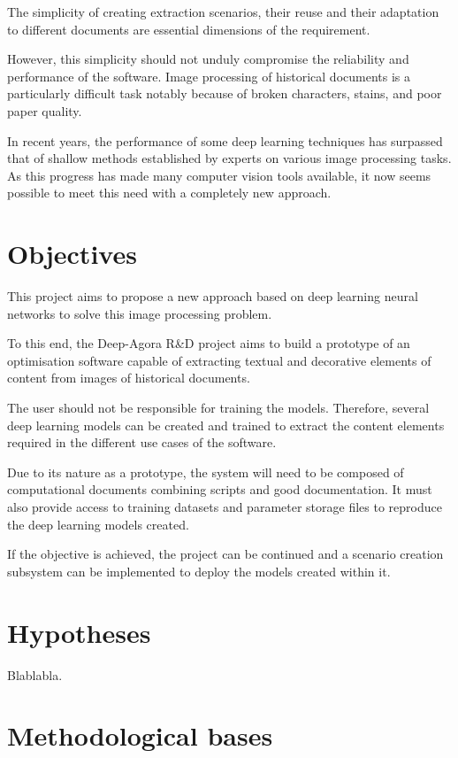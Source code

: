 \documentclass{polytech/polytech}
\numberwithin{figure}{chapter}
\begin{document}
The simplicity of creating extraction scenarios, their reuse and their adaptation to different documents are essential dimensions of the requirement.

However, this simplicity should not unduly compromise the reliability and performance of the software.
Image processing of historical documents is a particularly difficult task notably because of broken characters, stains, and poor paper quality.

In recent years, the performance of some deep learning techniques has surpassed that of shallow methods established by experts on various image processing tasks.
As this progress has made many computer vision tools available, it now seems possible to meet this need with a completely new approach.


\section{Objectives}

This project aims to propose a new approach based on deep learning neural networks to solve this image processing problem.

To this end, the Deep-Agora R\&D project aims to build a prototype of an optimisation software capable of extracting textual and decorative elements of content from images of historical documents.

The user should not be responsible for training the models. Therefore, several deep learning models can be created and trained to extract the content elements required in the different use cases of the software.

Due to its nature as a prototype, the system will need to be composed of computational documents combining scripts and good documentation. It must also provide access to training datasets and parameter storage files to reproduce the deep learning models created.

If the objective is achieved, the project can be continued and a scenario creation subsystem can be implemented to deploy the models created within it.


\section{Hypotheses}

Blablabla.

\section{Methodological bases}
\end{document}
